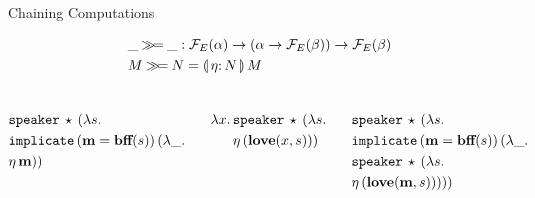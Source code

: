 \documentclass{beamer}
\begin{document}


\begin{frame}{Chaining Computations}

  \begin{align*}
  &\_ \hsbind \_ : \FF_E(\alpha) \to (\alpha \to \FF_E(\beta)) \to \FF_E(\beta) \\
  &M \hsbind N = \ap{\banana{\onto{\eta}{N}}}{M}
  \end{align*}

  \vfill

  \begin{columns}
    \pause
    \vspace*{-3mm}
    \begin{align*}
          &\mathtt{speaker}\,\star\,(\lambda s.\,  \\
          &\mathtt{implicate}\,(\textbf{m} = \textbf{bff}(s))\,(\lambda \_.\,  \\
          &\eta\,\textbf{m}))
    \end{align*}

    \pause
    \vspace*{-3mm}
    \begin{align*}
      \lambda x.\, &\mathtt{speaker}\,\star\,(\lambda s.\,  \\
              &\eta\,(\textbf{love}(x, s)))
    \end{align*}


    \pause
    \vspace*{-3mm}
    \begin{align*}
      &\mathtt{speaker}\,\star\,(\lambda s.\,  \\
      &\mathtt{implicate}\,(\textbf{m} = \textbf{bff}(s))\,(\lambda \_.\,  \\
      &\mathtt{speaker}\,\star\,(\lambda s.\,  \\
      &\eta\,(\textbf{love}(\textbf{m}, s)))))
    \end{align*}
  \end{columns}
\end{frame}
\end{document}

